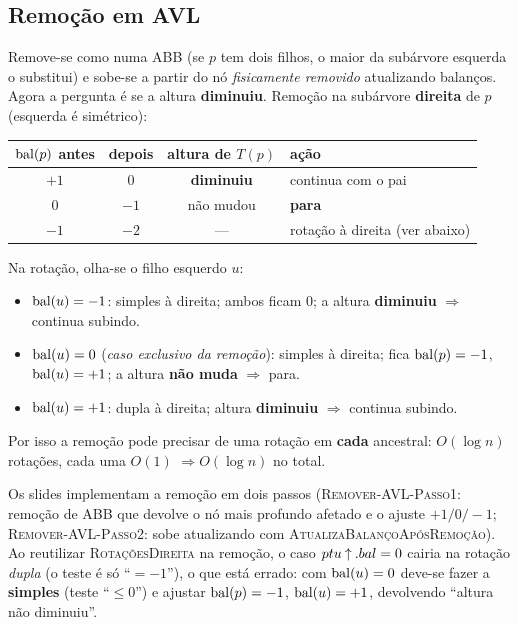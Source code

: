\subsection{Remoção em AVL}
Remove-se como numa ABB (se $p$ tem dois filhos, o maior da subárvore esquerda o substitui) e sobe-se a partir do nó \emph{fisicamente removido} atualizando balanços. Agora a pergunta é se a altura \textbf{diminuiu}. Remoção na subárvore \textbf{direita} de $p$ (esquerda é simétrico):
\begin{center}
\small
\begin{tabular}{@{}cccl@{}}
\toprule
$\operatorname{bal}(p)$ antes & depois & altura de $T(p)$ & ação\\
\midrule
$+1$ & $0$ & \textbf{diminuiu} & continua com o pai\\
$0$ & $-1$ & não mudou & \textbf{para}\\
$-1$ & $-2$ & --- & rotação à direita (ver abaixo)\\
\bottomrule
\end{tabular}
\end{center}
Na rotação, olha-se o filho esquerdo $u$:
\begin{itemize}
  \item $\operatorname{bal}(u)=-1$: simples à direita; ambos ficam $0$; a altura \textbf{diminuiu} $\Rightarrow$ continua subindo.
  \item $\operatorname{bal}(u)=0$ (\emph{caso exclusivo da remoção}): simples à direita; fica $\operatorname{bal}(p)=-1$, $\operatorname{bal}(u)=+1$; a altura \textbf{não muda} $\Rightarrow$ para.
  \item $\operatorname{bal}(u)=+1$: dupla à direita; altura \textbf{diminuiu} $\Rightarrow$ continua subindo.
\end{itemize}
Por isso a remoção pode precisar de uma rotação em \textbf{cada} ancestral: $O(\log n)$ rotações, cada uma $O(1)$ $\Rightarrow O(\log n)$ no total.

\begin{cuidado}
Os slides implementam a remoção em dois passos (\textsc{Remover-AVL-Passo1}: remoção de ABB que devolve o nó mais profundo afetado e o ajuste $+1/0/-1$; \textsc{Remover-AVL-Passo2}: sobe atualizando com \textsc{AtualizaBalançoApósRemoção}). Ao reutilizar \textsc{RotaçõesDireita} na remoção, o caso $ptu\mathbin{\uparrow}.bal=0$ cairia na rotação \emph{dupla} (o teste é só ``$=-1$''), o que está errado: com $\operatorname{bal}(u)=0$ deve-se fazer a \textbf{simples} (teste ``$\le0$'') e ajustar $\operatorname{bal}(p)=-1$, $\operatorname{bal}(u)=+1$, devolvendo ``altura não diminuiu''.
\end{cuidado}

